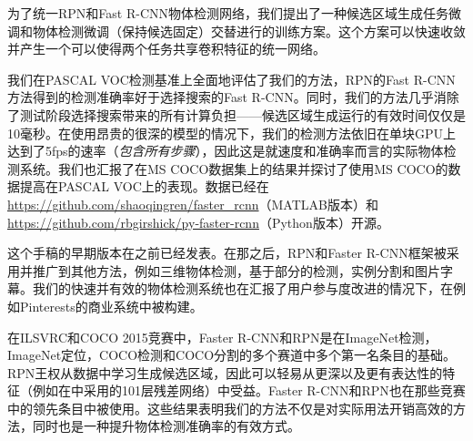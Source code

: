 \documentclass[../main]{subfile}
\begin{document}
为了统一RPN和Fast R-CNN\cite{fastrcnn}物体检测网络，我们提出了一种候选区域生成任务微调和物体检测微调（保持候选固定）交替进行的训练方案。这个方案可以快速收敛并产生一个可以使得两个任务共享卷积特征的统一网络。

我们在PASCAL VOC检测基准上全面地评估了我们的方法，RPN的Fast R-CNN方法得到的检测准确率好于选择搜索的Fast R-CNN。同时，我们的方法几乎消除了测试阶段选择搜索带来的所有计算负担——候选区域生成运行的有效时间仅仅是10毫秒。在使用昂贵的很深的模型\cite{vgg}的情况下，我们的检测方法依旧在单块GPU上达到了5fps的速率（\textit{包含所有步骤}），因此这是就速度和准确率而言的实际物体检测系统。我们也汇报了在MS COCO数据集上的结果并探讨了使用MS COCO的数据提高在PASCAL VOC上的表现。数据已经在\href{https://github.com/shaoqingren/faster\_rcnn}{https://github.com/shaoqingren/faster\_rcnn}（MATLAB版本）和\href{https://github.com/rbgirshick/py-faster-rcnn}{https://github.com/rbgirshick/py-faster-rcnn}（Python版本）开源。

这个手稿的早期版本在之前已经发表。在那之后，RPN和Faster R-CNN框架被采用并推广到其他方法，例如三维物体检测\cite{3dCase}，基于部分的检测\cite{partCase}，实例分割\cite{segCase}和图片字幕。我们的快速并有效的物体检测系统也在汇报了用户参与度改进的情况下，在例如Pinterests的商业系统中被构建。

在ILSVRC和COCO 2015竞赛中，Faster R-CNN和RPN是在ImageNet检测，ImageNet定位，COCO检测和COCO分割的多个赛道中多个第一名条目的基础。RPN王权从数据中学习生成候选区域，因此可以轻易从更深以及更有表达性的特征（例如在\cite{resnet}中采用的101层残差网络）中受益。Faster R-CNN和RPN也在那些竞赛中的领先条目中被使用。这些结果表明我们的方法不仅是对实际用法开销高效的方法，同时也是一种提升物体检测准确率的有效方式。
\end{document}
